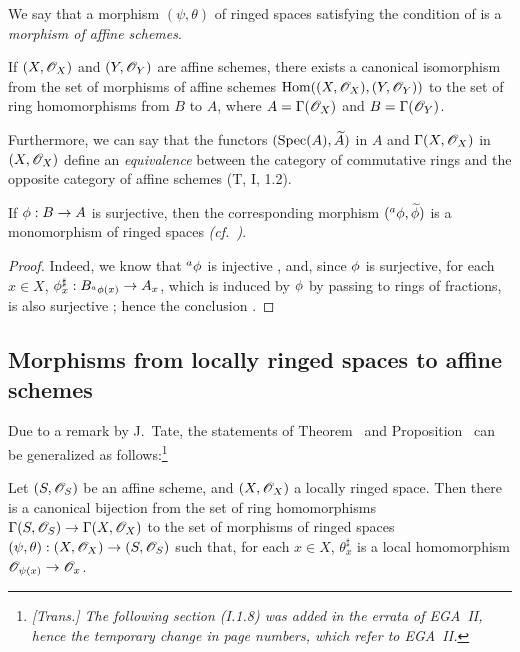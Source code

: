 We say that a morphism $(\psi,\theta)$ of ringed spaces satisfying the condition of  is a \emph{morphism of affine schemes}.

\begin{corollary}[1.7.4]
\label{1.1.7.4}
If $(X,\mathscr{O}_X)$ and $(Y,\mathscr{O}_Y)$ are affine schemes, there exists a canonical isomorphism from the set of morphisms of affine schemes $\operatorname{Hom}((X,\mathscr{O}_X),(Y,\mathscr{O}_Y))$ to the set of ring homomorphisms from $B$ to $A$, where $A=\Gamma(\mathscr{O}_X)$ and $B=\Gamma(\mathscr{O}_Y)$.
\end{corollary}

Furthermore, we can say that the functors $(\operatorname{Spec}(A),\widetilde{A})$ in $A$ and $\Gamma(X,\mathscr{O}_X)$ in $(X,\mathscr{O}_X)$ define an \emph{equivalence} between the category of commutative rings and the opposite category of affine schemes (T, I, 1.2).

\begin{corollary}[1.7.5]
\label{1.1.7.5}
If $\vphi:B\to A$ is surjective, then the corresponding morphism $({}^a\phi,\widetilde{\phi})$ is a monomorphism of ringed spaces \emph{(cf.~)}.
\end{corollary}

\begin{proof}
\label{proof-1.1.7.5}
Indeed, we know that ${}^a\phi$ is injective , and, since $\phi$ is
surjective, for each $x\in X$, $\vphi_x^\sharp:B_{{}^a\vphi(x)}\to A_x$, which is induced by $\phi$ by passing to rings of fractions, is also surjective ;
hence the conclusion .
\end{proof}

\subsection{Morphisms from locally ringed spaces to affine schemes}
\label{subsection:1.1.8}

Due to a remark by J.~Tate, the statements of Theorem~ and Proposition~ can be generalized as follows:\footnote{\emph{[Trans.] The following section (I.1.8) was added in the errata of EGA~II, hence the temporary change in page numbers, which refer to EGA~II.}}

\begin{proposition}[1.8.1]
\label{1.1.8.1}
Let $(S,\mathscr{O}_S)$ be an affine scheme, and $(X,\mathscr{O}_X)$ a locally ringed space.
Then there is a canonical bijection from the set of ring homomorphisms
$\Gamma(S,\sh{O}_S)\to\Gamma(X,\sh{O}_X)$ to the set of morphisms of ringed spaces $(\psi,\theta):(X,\sh{O}_X)\to(S,\sh{O}_S)$ such that, for each $x\in X$, $\theta_x^\sharp$ is a local homomorphism $\sh{O}_{\psi(x)}\to\sh{O}_x$.
\end{proposition}


